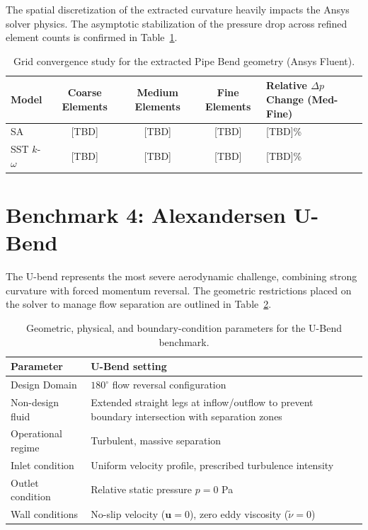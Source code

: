 The spatial discretization of the extracted curvature heavily impacts the Ansys solver physics. The asymptotic stabilization of the pressure drop across refined element counts is confirmed in Table~\ref{tab:app_pipebend_mesh}.

\begin{table}[htbp]
	\centering
	\footnotesize
	\caption{Grid convergence study for the extracted Pipe Bend geometry (Ansys Fluent).}
	\label{tab:app_pipebend_mesh}
	\renewcommand{\arraystretch}{1.2}
	\begin{tabularx}{\textwidth}{l c c c X}
		\hline
		\textbf{Model} & \textbf{Coarse Elements} & \textbf{Medium Elements} & \textbf{Fine Elements} & \textbf{Relative $\Delta p$ Change (Med-Fine)} \\
		\hline
		SA & [TBD] & [TBD] & [TBD] & [TBD]\% \\
		SST $k$-$\omega$ & [TBD] & [TBD] & [TBD] & [TBD]\% \\
		\hline
	\end{tabularx}
\end{table}

\section{Benchmark 4: Alexandersen U-Bend}
\label{app:config_ubend}

The U-bend represents the most severe aerodynamic challenge, combining strong curvature with forced momentum reversal. The geometric restrictions placed on the solver to manage flow separation are outlined in Table~\ref{tab:app_ubend_physical}.

\begin{table}[htbp]
	\centering
	\footnotesize
	\caption{Geometric, physical, and boundary-condition parameters for the U-Bend benchmark.}
	\label{tab:app_ubend_physical}
	\renewcommand{\arraystretch}{1.2}
	\begin{tabularx}{\textwidth}{l X}
		\hline
		\textbf{Parameter} & \textbf{U-Bend setting} \\
		\hline
		Design Domain & $180^\circ$ flow reversal configuration \\
		Non-design fluid & Extended straight legs at inflow/outflow to prevent boundary intersection with separation zones \\
		Operational regime & Turbulent, massive separation \\
		Inlet condition & Uniform velocity profile, prescribed turbulence intensity \\
		Outlet condition & Relative static pressure $p = 0$ Pa \\
		Wall conditions & No-slip velocity ($\mathbf{u} = 0$), zero eddy viscosity ($\tilde{\nu} = 0$) \\
		\hline
	\end{tabularx}
\end{table}

